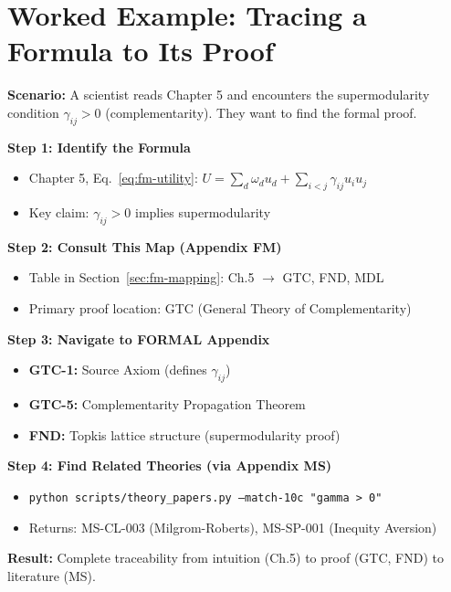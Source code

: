 \section{Worked Example: Tracing a Formula to Its Proof}
\label{sec:fm-example}

\begin{tcolorbox}[colback=green!5!white, colframe=green!75!black,
    title=\textbf{Worked Example: From Chapter 5 to Formal Proof}]

\textbf{Scenario:} A scientist reads Chapter 5 and encounters the supermodularity condition
$\gamma_{ij} > 0$ (complementarity). They want to find the formal proof.

\textbf{Step 1: Identify the Formula}
\begin{itemize}[nosep]
    \item Chapter 5, Eq.~\ref{eq:fm-utility}: $U = \sum_d \omega_d u_d + \sum_{i<j} \gamma_{ij} u_i u_j$
    \item Key claim: $\gamma_{ij} > 0$ implies supermodularity
\end{itemize}

\textbf{Step 2: Consult This Map (Appendix FM)}
\begin{itemize}[nosep]
    \item Table in Section~\ref{sec:fm-mapping}: Ch.5 $\rightarrow$ GTC, FND, MDL
    \item Primary proof location: GTC (General Theory of Complementarity)
\end{itemize}

\textbf{Step 3: Navigate to FORMAL Appendix}
\begin{itemize}[nosep]
    \item \textbf{GTC-1:} Source Axiom (defines $\gamma_{ij}$)
    \item \textbf{GTC-5:} Complementarity Propagation Theorem
    \item \textbf{FND:} Topkis lattice structure (supermodularity proof)
\end{itemize}

\textbf{Step 4: Find Related Theories (via Appendix MS)}
\begin{itemize}[nosep]
    \item \texttt{python scripts/theory\_papers.py --match-10c "gamma > 0"}
    \item Returns: MS-CL-003 (Milgrom-Roberts), MS-SP-001 (Inequity Aversion)
\end{itemize}

\textbf{Result:} Complete traceability from intuition (Ch.5) to proof (GTC, FND) to literature (MS).

\end{tcolorbox}

